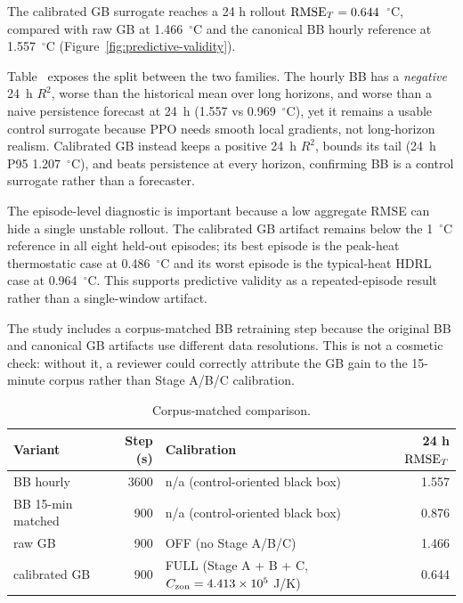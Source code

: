 The calibrated GB surrogate reaches a 24 h rollout \(\mathrm{RMSE}_T=0.644\)~$^\circ$C, compared with raw GB at 1.466~$^\circ$C and the canonical BB hourly reference at 1.557~$^\circ$C (Figure~\ref{fig:predictive-validity}).



Table~ exposes the split between the two families. The hourly BB has a \emph{negative} 24~h \(R^2\), worse than the historical mean over long horizons, and worse than a naive persistence forecast at 24~h (1.557 vs 0.969~$^\circ$C), yet it remains a usable control surrogate because PPO needs smooth local gradients, not long-horizon realism. Calibrated GB instead keeps a positive 24~h \(R^2\), bounds its tail (24~h P95 1.207~$^\circ$C), and beats persistence at every horizon, confirming BB is a control surrogate rather than a forecaster.



The episode-level diagnostic is important because a low aggregate RMSE can hide a single unstable rollout. The calibrated GB artifact remains below the 1~$^\circ$C reference in all eight held-out episodes; its best episode is the peak-heat thermostatic case at 0.486~$^\circ$C and its worst episode is the typical-heat HDRL case at 0.964~$^\circ$C. This supports predictive validity as a repeated-episode result rather than a single-window artifact.


\label{ssec:block1-corpus-matched}

The study includes a corpus-matched BB retraining step because the original BB and canonical GB artifacts use different data resolutions. This is not a cosmetic check: without it, a reviewer could correctly attribute the GB gain to the 15-minute corpus rather than Stage A/B/C calibration.

\begin{table}[pos={!ht}]
\centering
\small
\caption{Corpus-matched comparison.}
\label{tab:matched}
\begin{tabular}{lrlr}
\toprule
Variant & Step (s) & Calibration & 24 h \(\mathrm{RMSE}_T\) \\
\midrule
BB hourly & 3600 & n/a (control-oriented black box) & 1.557 \\
BB 15-min matched & 900 & n/a (control-oriented black box) & 0.876 \\
raw GB & 900 & OFF (no Stage A/B/C) & 1.466 \\
calibrated GB & 900 & FULL (Stage A + B + C, $C_{\mathrm{zon}} = 4.413\times10^5$ J/K) & 0.644 \\
\bottomrule
\end{tabular}
\end{table}


